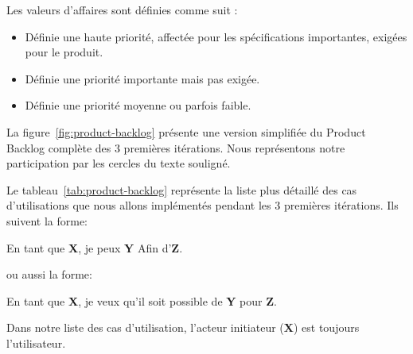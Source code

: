 Les valeurs d'affaires sont définies comme suit :
\begin{description}[align=right,labelwidth=1cm]
    \item [1] 
    \begin{itemize}
     \item  Définie une haute priorité, affectée pour les spécifications
        importantes, exigées pour le produit.
    \end{itemize}

    \item [2] 
    \begin{itemize}
     \item Définie une priorité importante mais pas exigée.
    \end{itemize}
    \item [3]
      \begin{itemize}
     \item  Définie une priorité moyenne ou parfois faible.
    \end{itemize}
   
\end{description}

La figure~\ref{fig:product-backlog} présente une version simplifiée du Product
Backlog complète des 3 premières itérations. Nous représentons notre
participation par les cercles du texte souligné.



Le tableau~\ref{tab:product-backlog} représente la liste plus détaillé des cas
d'utilisations que nous allons implémentés pendant les 3 premières itérations.
Ils suivent la forme:
\begin{displayquote}
    En tant que \textbf{X}, je peux \textbf{Y} Afin d'\textbf{Z}.
\end{displayquote}
ou aussi la forme:
\begin{displayquote}
    En tant que \textbf{X}, je veux qu'il soit possible de \textbf{Y} pour
    \textbf{Z}.
\end{displayquote}

Dans notre liste des cas d'utilisation, l'acteur initiateur (\textbf{X}) est
toujours l'utilisateur.

